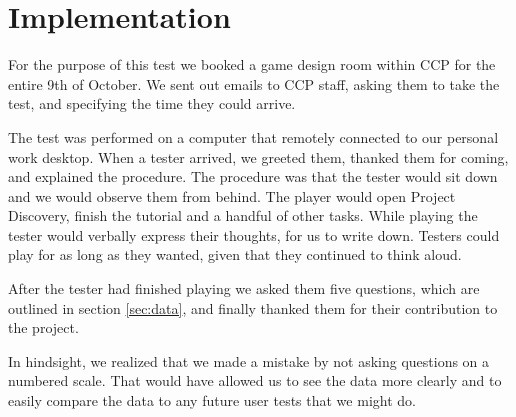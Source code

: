 \section{Implementation}\label{sec:implementation}
For the purpose of this test we booked a game design room within CCP for the entire 9th of October. We sent out emails to CCP staff, asking them to take the test, and specifying the time they could arrive.

The test was performed on a computer that remotely connected to our personal work desktop. When a tester arrived, we greeted them, thanked them for coming, and explained the procedure. The procedure was that the tester would sit down and we would observe them from behind. The player would open Project Discovery, finish the tutorial and a handful of other tasks. While playing the tester would verbally express their thoughts, for us to write down. Testers could play for as long as they wanted, given that they continued to think aloud.

After the tester had finished playing we asked them five questions, which are outlined in section \ref{sec:data}, and finally thanked them for their contribution to the project.

In hindsight, we realized that we made a mistake by not asking questions on a numbered scale. That would have allowed us to see the data more clearly and to easily compare the data to any future user tests that we might do.